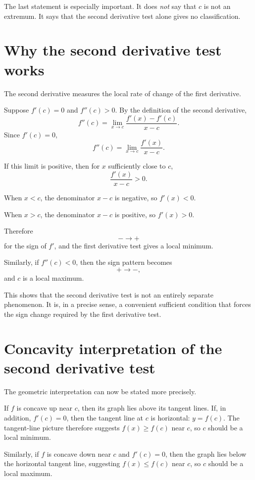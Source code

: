 \documentclass{essay}
\begin{document}
The last statement is especially important. It does \emph{not} say that \(c\) is not an extremum. It says that the second derivative test alone gives no classification.

\section{Why the second derivative test works}

The second derivative measures the local rate of change of the first derivative.

Suppose \(f'(c)=0\) and \(f''(c)>0\).
By the definition of the second derivative,
\[ f''(c) = \lim_{x\to c} \frac{f'(x)-f'(c)}{x-c}. \]
Since \(f'(c)=0\),
\[ f''(c) = \lim_{x\to c} \frac{f'(x)}{x-c}. \]

If this limit is positive, then for \(x\) sufficiently close to \(c\),
\[ \frac{f'(x)}{x-c}>0. \]

When \(x<c\), the denominator \(x-c\) is negative, so \(f'(x)<0\).

When \(x>c\), the denominator \(x-c\) is positive, so \(f'(x)>0\).

Therefore
\[ -\longrightarrow + \]
for the sign of \(f'\), and the first derivative test gives a local minimum.

Similarly, if \(f''(c)<0\), then the sign pattern becomes
\[ +\longrightarrow -, \]
and \(c\) is a local maximum.

This shows that the second derivative test is not an entirely separate phenomenon. It is, in a precise sense, a convenient sufficient condition that forces the sign change required by the first derivative test.

\section{Concavity interpretation of the second derivative test}

The geometric interpretation can now be stated more precisely.

If \(f\) is concave up near \(c\), then its graph lies above its tangent lines. If, in addition, \(f'(c)=0\), then the tangent line at \(c\) is horizontal: \(y=f(c)\). The tangent-line picture therefore suggests \(f(x)\geq f(c)\) near \(c\), so \(c\) should be a local minimum.

Similarly, if \(f\) is concave down near \(c\) and \(f'(c)=0\), then the graph lies below the horizontal tangent line, suggesting \(f(x)\leq f(c)\) near \(c\), so \(c\) should be a local maximum.
\end{document}
